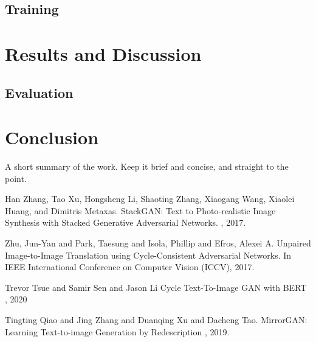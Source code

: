 \documentclass{article}
\begin{document}
	\subsection{Training}

	\section{Results and Discussion}
	

	\subsection{Evaluation}	


	\section{Conclusion}

	    A short summary of the work. Keep it brief and concise, and straight to the point.


	  
	
	
	\begin{thebibliography}{1}
		Han Zhang, Tao Xu, Hongsheng Li, Shaoting Zhang, Xiaogang Wang, Xiaolei Huang, and 
		Dimitris Metaxas.
		\newblock StackGAN: Text to Photo-realistic Image Synthesis with Stacked 
		Generative Adversarial Networks.
		, 2017.
		

		Zhu, Jun-Yan and Park, Taesung and Isola, Phillip and Efros, Alexei A.
		\newblock Unpaired Image-to-Image Translation using Cycle-Consistent Adversarial Networks.
		\newblock In IEEE International Conference on Computer Vision (ICCV), 2017.

		Trevor Tsue and Samir Sen and Jason Li
		\newblock Cycle Text-To-Image GAN with BERT
		, 2020
		
		Tingting Qiao and Jing Zhang and Duanqing Xu and Dacheng Tao.
		\newblock MirrorGAN: Learning Text-to-image Generation by Redescription
		, 2019.
		
	\end{thebibliography}
	
	
\end{document}
